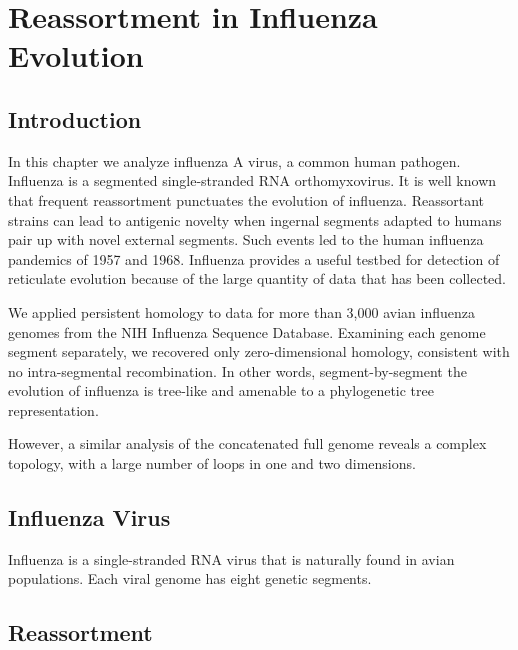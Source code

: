 \chapter{Reassortment in Influenza Evolution}
\label{ch:influenza}

\section{Introduction}

In this chapter we analyze influenza A virus, a common human pathogen.
Influenza is a segmented single-stranded RNA orthomyxovirus.
It is well known that frequent reassortment punctuates the evolution of influenza.
Reassortant strains can lead to antigenic novelty when ingernal segments adapted to humans pair up with novel external segments.
Such events led to the human influenza pandemics of 1957 and 1968.
Influenza provides a useful testbed for detection of reticulate evolution because of the large quantity of data that has been collected.

We applied persistent homology to data for more than 3,000 avian influenza genomes from the NIH Influenza Sequence Database.
Examining each genome segment separately, we recovered only zero-dimensional homology, consistent with no intra-segmental recombination.
In other words, segment-by-segment the evolution of influenza is tree-like and amenable to a phylogenetic tree representation.

However, a similar analysis of the concatenated full genome reveals a complex topology, with a large number of loops in one and two dimensions.

\section{Influenza Virus}
\label{sec:flu_introduction}

Influenza is a single-stranded RNA virus that is naturally found in avian populations.
Each viral genome has eight genetic segments.

\section{Reassortment}
\label{sec:flu_reassortment}


